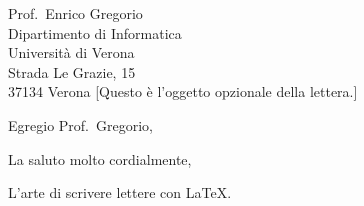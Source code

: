 \documentclass[boldsubject,italicsignature,smartindent]{letteracdp}
\begin{document}
\begin{letter}{Prof.~Enrico Gregorio \\
Dipartimento di Informatica \\
Università di Verona \\
Strada Le Grazie, 15 \\
37134 Verona}%
[Questo è l’oggetto opzionale della lettera.]
\opening{Egregio Prof.~Gregorio,}
\lipsum[1]
\closing{La saluto molto cordialmente,}

\begin{enclosures}
	\item L’arte di scrivere lettere con \LaTeX.
\end{enclosures}
\end{letter}
\end{document}
